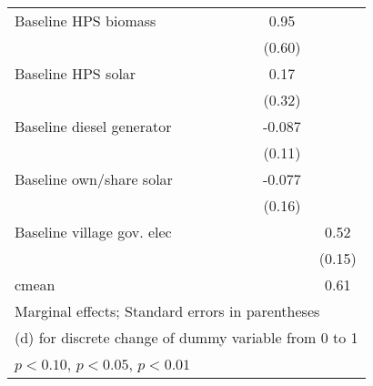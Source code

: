 \begin{table}[htbp]
\begin{tabular*}{1\hsize}{@{\hskip\tabcolsep\extracolsep\fill}l*{6}{c}}
Baseline HPS biomass&                  &                  &                  &                  &     0.95         &                  \\
                &                  &                  &                  &                  &   (0.60)         &                  \\
Baseline HPS solar&                  &                  &                  &                  &     0.17         &                  \\
                &                  &                  &                  &                  &   (0.32)         &                  \\
Baseline diesel generator&                  &                  &                  &                  &   -0.087         &                  \\
                &                  &                  &                  &                  &   (0.11)         &                  \\
Baseline own/share solar&                  &                  &                  &                  &   -0.077         &                  \\
                &                  &                  &                  &                  &   (0.16)         &                  \\
Baseline village gov. elec&                  &                  &                  &                  &                  &     0.52\sym{***}\\
                &                  &                  &                  &                  &                  &   (0.15)         \\
\midrule
cmean           &                  &                  &                  &                  &                  &     0.61         \\
\bottomrule
\multicolumn{7}{l}{\footnotesize Marginal effects; Standard errors in parentheses}\\
\multicolumn{7}{l}{\footnotesize  (d) for discrete change of dummy variable from 0 to 1}\\
\multicolumn{7}{l}{\footnotesize \sym{*} \(p<0.10\), \sym{**} \(p<0.05\), \sym{***} \(p<0.01\)}\\
\end{tabular*}
\end{table}

